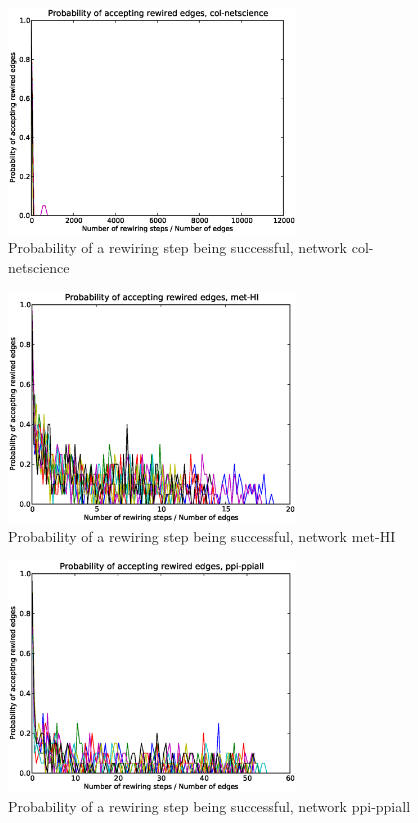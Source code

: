 \begin{figure}[p]
\centering
\includegraphics[width=3in]{Figures/Paccept-col-netscience.eps}
\caption{Probability of a rewiring step being successful, network col-netscience}
\label{fig:Paccept-col-netscience}
\end{figure}

\begin{figure}[p]
\centering
\includegraphics[width=3in]{Figures/Paccept-met-HI.eps}
\caption{Probability of a rewiring step being successful, network met-HI}
\label{fig:Paccept-met-HI}
\end{figure}

\begin{figure}[p]
\centering
\includegraphics[width=3in]{Figures/Paccept-ppi-ppiall.eps}
\caption{Probability of a rewiring step being successful, network ppi-ppiall}
\label{fig:Paccept-ppi-ppiall}
\end{figure}

